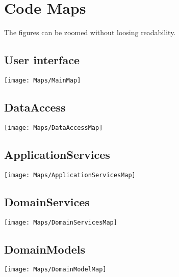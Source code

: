 \chapter{Code Maps}
\label{app:codemaps}
The figures can be zoomed without loosing readability.

\section{User interface}
\texttt{[image: Maps/MainMap]}

\section{DataAccess}
\texttt{[image: Maps/DataAccessMap]}

\section{ApplicationServices}
\texttt{[image: Maps/ApplicationServicesMap]}

\section{DomainServices}
\texttt{[image: Maps/DomainServicesMap]}

\section{DomainModels}
\texttt{[image: Maps/DomainModelMap]}

